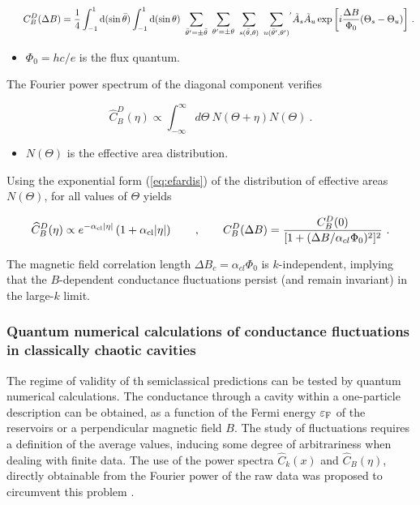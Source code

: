 \documentclass[a4paper,10pt]{article}
\newcommand{\dif}{\mathrm{d}}
\newcommand{\nin}{\noindent}
\def\btheta{\bar {\theta}}
\newcommand{\be}{\begin{equation}}
\newcommand{\ee}{\end{equation}}
\newcommand{\dlB}{\Delta B}
\newcommand{\alc}{\alpha_{\rm cl}}
\begin{document}
\be
\hspace{0.6cm} C_B^D(\dlB) = \frac{1}{4}
\int_{-1}^{1} \dif (\sin\btheta)\int_{-1}^{1} \dif (\sin\theta)
\ \sum_{\btheta^{\prime}=\pm \btheta} \ \sum_{\theta^{\prime}=\pm \theta}
\ \sum_{s(\btheta,\theta)} \ 
\sum_{u(\btheta^{\prime},\theta^{\prime})}\!{^{^{\prime}}} 
 \tilde{A}_s \tilde{A}_u
\exp{\left[i \frac{\dlB}{\Phi_0} (\Theta_s - \Theta_u) \right]} \ .
\label{eq:CdB1}
\ee

\begin{itemize}

\item $\Phi_{0}=hc/e$ is the flux quantum.  

\end{itemize}

\nin The Fourier power spectrum of the diagonal component verifies

\be
\widehat{C}_B^D (\eta) \propto 
\int_{-\infty}^{\infty}\! d\Theta \:N(\Theta+\eta) N(\Theta) \ .
\label{eq:CdB3}
\ee

\begin{itemize}

\item $N(\Theta)$ is the effective area distribution. 

\end{itemize}

\nin Using the exponential form (\ref{eq:efardis}) of the distribution of 
effective areas $N(\Theta)$, for all values of $\Theta$ yields \cite{Jal90}

\be
\widehat{C}_B^D (\eta) \propto e^{-\alc |\eta|} \left(1+ \alc |\eta|\right)
\qquad , \qquad C_B^D (\dlB) = \frac{C_B^D(0)}{[1 + (\dlB/ \alpha_{cl} \Phi_0 )^2 ]^2} \ .
\label{eq:CdB4}
\ee

\nin The magnetic field correlation length $\dlB_c=\alpha_{cl} \Phi_0$ is $k$-independent, implying that the $B$-dependent conductance fluctuations  persist (and remain invariant) in the large-$k$ limit.

\subsubsection{Quantum numerical calculations of conductance fluctuations in classically chaotic cavities}
\label{subsubsec:spvqnc}

The regime of validity of th semiclassical predictions can be tested by 
quantum numerical calculations. The conductance through a cavity within a one-particle description can be obtained, as a function of the Fermi energy $\varepsilon_{\rm F}$ of the reservoirs or a perpendicular magnetic field $B$. The study of fluctuations requires a definition of the average values, inducing some degree of arbitrariness when dealing with finite data. The use of the power spectra $\widehat{C}_k(x)$ and $\widehat{C}_B(\eta)$, directly obtainable from the Fourier power of the raw data was proposed to circumvent this problem \cite{Jal90}. 
\end{document}
